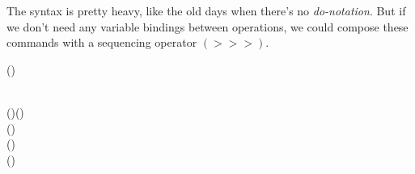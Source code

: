 The syntax is pretty heavy, like the old days when there's no
 \emph{do-notation}\cite{history}. But if we don't need any variable bindings
 between operations, we could compose these commands with a sequencing operator
 \ensuremath{(\mathbin{>>>})}.

\begin{hscode}\SaveRestoreHook
{}%
%
\>[B]{}(\mathbin{>>>})\mathbin{::}\;\Rightarrow {}\;\;\;\to {}\;\;\;\to {}\;\;\;\<[E]%
\ColumnHook
\end{hscode}\resethooks
\begin{hscode}\SaveRestoreHook
{}%
%
%
%
\>[B]{}\mathrel{=}\<[E]%
\\
\>[B]{}\<[5]%
\>[5]{}\mathbin{>>>}\;(\mathbin{::}\;)\;(\mathbin{::}\;){}\<[E]%
\\
\>[B]{}\<[5]%
\>[5]{}\mathbin{>>>}\;{}\<[17]%
\>[17]{}(\mathbin{::}\;){}\<[E]%
\\
\>[B]{}\<[5]%
\>[5]{}\mathbin{>>>}\;{}\<[17]%
\>[17]{}(\mathbin{::}\;)\;\<[E]%
\\
\>[B]{}\<[5]%
\>[5]{}\mathbin{>>>}\;{}\<[17]%
\>[17]{}(\mathbin{::}\;){}\<[E]%
\ColumnHook
\end{hscode}\resethooks

